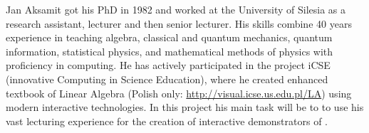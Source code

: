 
\begin{participant}[type=PI,PM=12,gender=male]{Jan Aksamit}
got his PhD in 1982 and worked at the University of Silesia as a research
assistant, lecturer and then senior lecturer. His skills combine 40 years 
experience in teaching algebra, classical and quantum
mechanics, quantum information, statistical physics, and mathematical
methods of physics with proficiency in computing. He has actively
participated in the project iCSE (innovative Computing in Science
Education), where he created \Sage enhanced textbook of Linear Algebra
(Polish only: \url{http://visual.icse.us.edu.pl/LA}) using modern
interactive technologies. In this project his main task will be to
to use his vast lecturing experience for the creation of
interactive demonstrators of \TheProject.
\end{participant}

